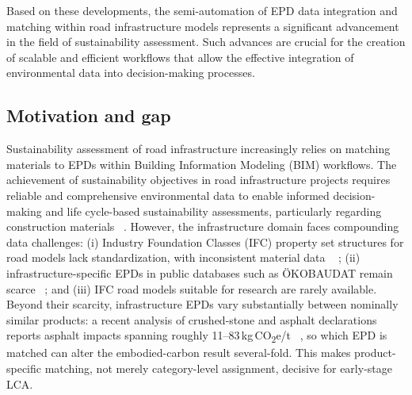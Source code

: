 \documentclass[10pt, a4paper, twocolumn]{article}
\begin{document}
Based on these developments, the semi-automation of EPD data integration and matching within road infrastructure models represents a significant advancement in the field of sustainability assessment. Such advances are crucial for the creation of scalable and efficient workflows that allow the effective integration of environmental data into decision-making processes.


\subsection{Motivation and gap}

Sustainability assessment of road infrastructure increasingly relies on matching materials to EPDs within Building Information Modeling (BIM) workflows. The achievement of sustainability objectives in road infrastructure projects requires reliable and comprehensive environmental data to enable informed decision-making and life cycle-based sustainability assessments, particularly regarding construction materials ~\cite{Kaus.2025}. However, the infrastructure domain faces compounding data challenges: (i) Industry Foundation Classes (IFC) property set structures for road models lack standardization, with inconsistent material data ~\cite{Wastiels.2019,PotrcObrecht.2020} ; (ii) infrastructure-specific EPDs in public databases such as ÖKOBAUDAT remain scarce ~\cite{Kaus.2025}; and (iii) IFC road models suitable for research are rarely available.
Beyond their scarcity, infrastructure EPDs vary substantially between nominally
similar products: a recent analysis of crushed-stone and asphalt declarations
reports asphalt impacts spanning roughly 11--83\,kg\,CO\textsubscript{2}e/t
~\cite{Petrovic.2025}, so which EPD is matched can alter the embodied-carbon result
several-fold. This makes product-specific matching, not merely category-level
assignment, decisive for early-stage LCA.
\end{document}
